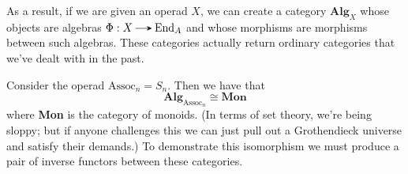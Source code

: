 As a result, if we are given an operad $X$, we can create a category 
$\textbf{Alg}_X$ whose objects are algebras $\Phi: X \to \aend_A$ 
and whose morphisms are morphisms between such algebras. These categories 
actually return ordinary categories that we've dealt with in the past. 

\begin{example}
    Consider the operad $\text{Assoc}_n = S_n$. Then we have that 
    \[
        \textbf{Alg}_{\text{Assoc}_n} \cong \textbf{Mon}
    \]
    where \textbf{Mon} is the category of monoids. (In terms of set theory, we're 
    being sloppy; but if anyone challenges this we can just pull out a Grothendieck universe 
    and satisfy their demands.) 
    To demonstrate this isomorphism we must produce a pair of inverse functors 
    between these categories. 
    

\end{example}
